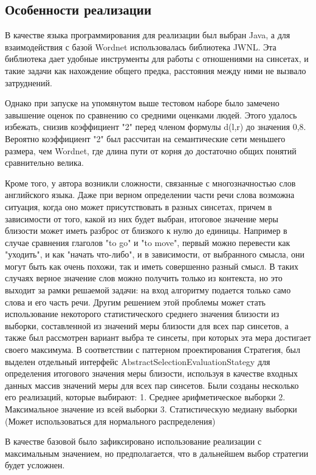 \subsection{Особенности реализации}
В качестве языка программирования для реализации был выбран Java,
а для взаимодействия с базой Wordnet использовалась библиотека JWNL\cite{jwnl}.
Эта библиотека дает удобные инструменты для работы с отношениями на синсетах,
и такие задачи как нахождение общего предка, расстояния между ними не
вызвало затруднений.

Однако при запуске на упомянутом выше тестовом наборе было замечено
завышение оценок
по сравнению со средними оценками людей.
Этого удалось избежать, снизив коэффициент "2" перед членом формулы d(l,r)
до значения 0,8. Вероятно коэффициент "2" был рассчитан на
семантические сети меньшего
размера, чем Wordnet, где длина пути от корня до достаточно общих
понятий сравнительно велика.

Кроме того, у  автора возникли сложности, связанные с многозначностью
слов английского языка.
Даже при верном определении части речи слова возможна ситуация, когда
оно может присутствовать
в разных синсетах, причем в зависимости от того, какой из них будет выбран,
итоговое значение меры близости может иметь разброс от близкого к нулю
до единицы.
Например в случае сравнения глаголов "to go" и "to move",  первый
можно перевести как "уходить",
и как "начать что-либо", и в зависимости, от выбранного смысла, они
могут быть как очень похожи,
так и иметь совершенно разный смысл.
В таких случаях верное значение слов можно получить только из
контекста, но это выходит
за рамки решаемой задачи: на вход алгоритму подается только само слова
и его часть речи.
Другим решением этой проблемы может стать использование некоторого статистического
среднего значения близости из выборки, составленной из значений меры
близости для всех пар синсетов,
а также был рассмотрен вариант выбра те синсеты, при которых
эта мера достигает своего максимума.
В соответствии с паттерном проектирования Стратегия, был выделен
отдельный интерфейс
AbstractSelectionEvaluationStategy для определения итогового значения
меры близости, используя
в качестве входных данных массив значений меры для всех пар синсетов.
Были созданы несколько его реализаций, которые выбирают:
1. Среднее арифметическое выборки
2. Максимальное значение из всей выборки
3. Статистическую медиану выборки (Может использоваться для
нормального распределения)

В качестве базовой было зафиксировано использование реализации с
максимальным значением,
но предполагается, что в дальнейшем выбор стратегии будет усложнен.

